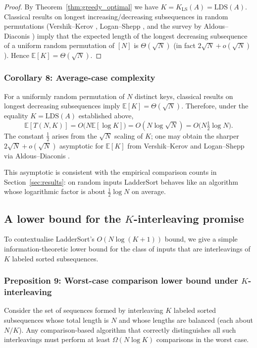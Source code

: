\documentclass[12pt,a4paper]{article}
\theoremstyle{plain}
\theoremstyle{definition}
\begin{document}
\begin{proof}
By Theorem~\ref{thm:greedy_optimal} we have $K=K_{\mathrm{LS}}(A)=\mathrm{LDS}(A)$.
Classical results on longest increasing/decreasing subsequences in random
permutations (Vershik--Kerov \cite{VershikKerov1977},
Logan--Shepp \cite{LoganShepp1977}, and the survey by
Aldous--Diaconis \cite{AldousDiaconis1999}) imply that the expected length
of the longest decreasing subsequence of a uniform random permutation of
$[N]$ is $\Theta(\sqrt{N})$ (in fact $2\sqrt{N}+o(\sqrt{N})$).  Hence
$\mathbb{E}[K]=\Theta(\sqrt{N})$.
\end{proof}

\subsubsection{Corollary 8: Average-case complexity}
\label{cor:avgcase}
For a uniformly random permutation of $N$ distinct keys, classical results
on longest decreasing subsequences imply $\mathbb{E}[K]=\Theta(\sqrt{N})$.
Therefore, under the equality $K=\mathrm{LDS}(A)$ established above,
\[ \mathbb{E}[T(N,K)] = O\bigl(N\mathbb{E}[\log K]\bigr) = O(N\log\sqrt{N}) = O\bigl(N\tfrac{1}{2}\log N\bigr).
\]
The constant $\tfrac{1}{2}$ arises from the $\sqrt{N}$ scaling of $K$; one
may obtain the sharper $2\sqrt{N}+o(\sqrt{N})$ asymptotic for $\mathbb{E}[K]$
from Vershik--Kerov and Logan--Shepp via Aldous--Diaconis \cite{VershikKerov1977,LoganShepp1977,AldousDiaconis1999}.


This asymptotic is consistent with the empirical comparison counts in
Section~\ref{sec:results}: on random inputs LadderSort behaves like an
algorithm whose logarithmic factor is about $\tfrac{1}{2}\log N$ on average.

\subsection{A lower bound for the $K$-interleaving promise}
\label{sec:lowerbound}

To contextualise LadderSort's $O(N\log(K+1))$ bound, we give a simple
information-theoretic lower bound for the class of inputs that are
interleavings of $K$ labeled sorted subsequences.

\subsubsection{Preposition 9: Worst-case comparison lower bound under $K$-interleaving}
\label{prop:lowerbound}
Consider the set of sequences formed by interleaving $K$ labeled sorted
subsequences whose total length is $N$ and whose lengths are balanced
(each about $N/K$).  Any comparison-based algorithm that correctly
distinguishes all such interleavings must perform at least
\(\Omega(N\log K)\) comparisons in the worst case.
\end{document}
